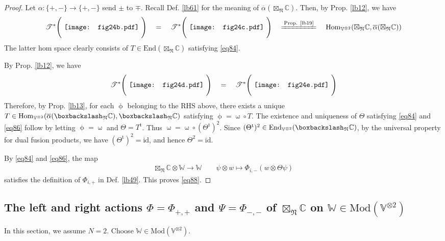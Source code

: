 \documentclass[11pt,b5paper,notitlepage]{article}
\theoremstyle{definition}
\theoremstyle{plain}
\newcommand{\ovl}{\overline}
\newcommand{\tr}{\mathrm{t}} %
\newcommand{\End}{\mathrm{End}} %
\newcommand{\Hom}{\mathrm{Hom}}
\newcommand{\Vbb}{\mathbb V}
\newcommand{\Wbb}{\mathbb W}
\newcommand{\Cbb}{\mathbb C}
\newcommand{\<}{\left\langle}
\renewcommand{\>}{\right\rangle}
\newcommand{\ST}{\mathscr{T}}
\newcommand{\bbs}{\boxbackslash}
\newcommand{\Mod}{\mathrm{Mod}}
\newcommand{\id}{\mathrm{id}}
\newcommand{\fn}{\mathfrak{N}}
\numberwithin{equation}{section}
\begin{document}
\begin{proof}
Let $\alpha:\{+,-\}\rightarrow\{+,-\}$ send $\pm$ to $\mp$. Recall Def. \ref{lb61} for the meaning of $\ovl\alpha(\boxtimes_\fn\Cbb)$. Then, by Prop. \ref{lb12}, we have
\begin{align}
\ST^*\Bigg(\vcenter{\hbox{{
				   \texttt{[image: fig24b.pdf]}}}}~\Bigg)\quad=\quad
\ST^*\Bigg(\vcenter{\hbox{{
				   \texttt{[image: fig24c.pdf]}}}}~\Bigg)\quad\xlongequal{\text{Prop. \ref{lb19}}}\quad\Hom_{\Vbb^{\otimes 2}}(\boxtimes_\fn\Cbb,\ovl\alpha(\boxtimes_\fn\Cbb))
\end{align}
The latter hom space clearly consists of $T\in\End(\boxtimes_\fn\Cbb)$ satisfying \eqref{eq84}.

By Prop. \ref{lb12}, we have
\begin{align}
\ST^*\Bigg(\vcenter{\hbox{{
				   \texttt{[image: fig24d.pdf]}}}}~\Bigg)\quad=\quad
\ST^*\Bigg(\vcenter{\hbox{{
				   \texttt{[image: fig24e.pdf]}}}}~\Bigg)
\end{align}
Therefore, by Prop. \ref{lb13}, for each $\upphi$ belonging to the RHS above, there exists a unique $T\in\Hom_{\Vbb^{\otimes 2}}(\ovl\alpha(\bbs_\fn\Cbb),\bbs_\fn\Cbb)$ satisfying $\upphi=\upomega\circ T$. The existence and uniqueness of $\Theta$ satisfying \eqref{eq84} and \eqref{eq86} follow by letting $\upphi=\upomega$ and $\Theta=T^\tr$. Thus $\upomega=\upomega\circ(\Theta^\tr)^2$. Since $(\Theta^\tr)^2\in\End_{\Vbb^{\otimes 2}}(\bbs_\fn\Cbb)$, by the universal property for dual fusion products, we have $(\Theta^\tr)^2=\id$, and hence $\Theta^2=\id$.

By \eqref{eq84} and \eqref{eq86}, the map
\begin{align*}
\boxtimes_\fn\Cbb\otimes\Wbb\rightarrow\Wbb\qquad \psi\otimes w\mapsto\Phi_{i,-}(w\otimes\Theta\psi)
\end{align*}
satisfies the definition of $\Phi_{i,+}$ in Def. \ref{lb49}. This proves \eqref{eq88}. 
\end{proof}






\subsection{The  left and right actions $\Phi=\Phi_{+,+}$ and $\Psi=\Phi_{-,-}$ of $\boxtimes_\fn\Cbb$ on $\Wbb\in \Mod(\Vbb^{\otimes 2})$}
\label{sec2}
In this section, we assume $N=2$. Choose $\Wbb\in \Mod(\Vbb^{\otimes 2})$. 
\end{document}

